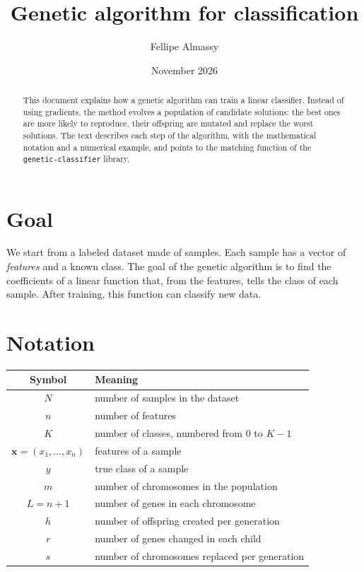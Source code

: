 \documentclass[11pt,a4paper]{article}
\title{Genetic algorithm for classification}
\author{Fellipe Almassy}
\date{November 2026}
\newcommand{\cod}[1]{\texttt{#1}}
\begin{document}
\maketitle


\begin{abstract}
This document explains how a genetic algorithm can train a linear classifier.
Instead of using gradients, the method evolves a population of candidate solutions:
the best ones are more likely to reproduce, their offspring are mutated and replace
the worst solutions. The text describes each step of the algorithm, with the
mathematical notation and a numerical example, and points to the matching function
of the \cod{genetic-classifier} library.
\end{abstract}

\section{Goal}

We start from a labeled dataset made of samples. Each sample has a vector of
\emph{features} and a known class. The goal of the genetic algorithm is to find the
coefficients of a linear function that, from the features, tells the class of each
sample. After training, this function can classify new data.

\section{Notation}

\begin{center}
\begin{tabular}{cl}
\toprule
Symbol & Meaning \\
\midrule
$N$ & number of samples in the dataset \\
$n$ & number of features \\
$K$ & number of classes, numbered from $0$ to $K-1$ \\
$\mathbf{x} = (x_1, \dots, x_n)$ & features of a sample \\
$y$ & true class of a sample \\
$m$ & number of chromosomes in the population \\
$L = n + 1$ & number of genes in each chromosome \\
$h$ & number of offspring created per generation \\
$r$ & number of genes changed in each child \\
$s$ & number of chromosomes replaced per generation \\
\bottomrule
\end{tabular}
\end{center}
\end{document}
